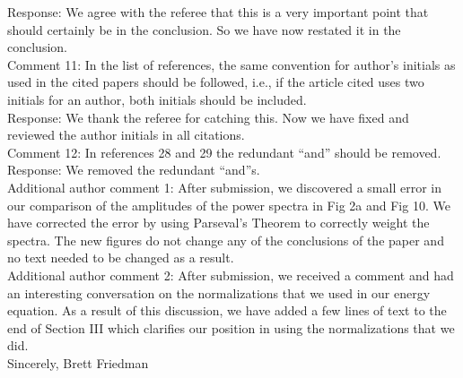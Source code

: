 \documentclass[12pt]{article}
\begin{document}
Response: We agree with the referee that this is a very important point that should certainly be in the conclusion. So we have now restated it in the conclusion. \\

Comment 11:  In the list of references, the same convention for author’s initials as used in the cited
papers should be followed, i.e., if the article cited uses two initials for an author, both
initials should be included. \\

Response: We thank the referee for catching this. Now we have fixed and reviewed the author initials in all citations. \\

Comment 12: In references 28 and 29 the redundant “and” should be removed. \\

Response: We removed the redundant ``and''s. \\


Additional author comment 1: After submission, we discovered a small error in our comparison of the amplitudes of the power spectra in Fig 2a and Fig 10. 
We have corrected the error by using Parseval's Theorem to correctly weight the spectra. The new figures do not change any of the conclusions of the paper and no text needed to be changed as a result. \\

Additional author comment 2: After submission, we received a comment and had an interesting conversation on the normalizations that we used in our energy equation. As a result of this discussion,
we have added a few lines of text to the end of Section III which clarifies our position in using the normalizations that we did. \\

Sincerely,
Brett Friedman
\end{document}

